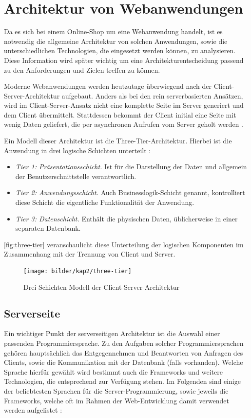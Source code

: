 \section{Architektur von Webanwendungen}\label{web_architecture} \thispagestyle{nomarkstyle}
Da es sich bei einem Online-Shop um eine Webanwendung handelt, ist es notwendig die allgemeine Architektur von solchen Anwendungen, sowie die unterschiedlichen Technologien, die eingesetzt werden können, zu analysieren.
Diese Information wird später wichtig um eine Architekturentscheidung passend zu den Anforderungen und Zielen treffen zu können.

Moderne Webanwendungen werden heutzutage überwiegend nach der Client-Server-Architektur aufgebaut. Anders als bei den rein serverbasierten Ansätzen, wird im Client-Server-Ansatz nicht eine komplette Seite im Server generiert und dem Client übermittelt.
Stattdessen bekommt der Client initial eine Seite mit wenig Daten geliefert, die per asynchronen Aufrufen vom Server geholt werden \cite{Saternos2014}.

Ein Modell dieser Architektur ist die Three-Tier-Architektur. Hierbei ist die Anwendung in drei logische Schichten unterteilt \cite{Techopedia2017}:
\begin{itemize}
	\item \textit{Tier 1: Präsentationsschicht.} Ist für die Darstellung der Daten und allgemein der Benutzerschnittstelle verantwortlich.
	\item \textit{Tier 2: Anwendungsschicht.} Auch Businesslogik-Schicht genannt, kontrolliert diese Schicht die eigentliche Funktionalität der Anwendung.
	\item \textit{Tier 3: Datenschicht.} Enthält die physischen Daten, üblicherweise in einer separaten Datenbank.
\end{itemize}

\autoref{fig:three-tier} veranschaulicht diese Unterteilung der logischen Komponenten im Zusammenhang mit der Trennung von Client und Server. %

\begin{figure}[ht!]
	\centering
	\texttt{[image: bilder/kap2/three-tier]}
	\caption{Drei-Schichten-Modell der Client-Server-Architektur \cite{Conallen2000}}
	\label{fig:three-tier}
\end{figure}

\subsection{Serverseite}
Ein wichtiger Punkt der serverseitigen Architektur ist die Auswahl einer passenden Programmiersprache. Zu den Aufgaben solcher Programmiersprachen gehören hauptsächlich das Entgegennehmen und Beantworten von Anfragen des Clients, sowie die Kommunikation mit der Datenbank (falls vorhanden).
Welche Sprache hierfür gewählt wird bestimmt auch die Frameworks und weitere Technologien, die entsprechend zur Verfügung stehen. Im Folgenden sind einige der beliebtesten Sprachen für die Server-Programmierung, sowie jeweils die Frameworks, welche oft im Rahmen der Web-Entwicklung damit verwendet werden aufgelistet \cite{School2016}:

